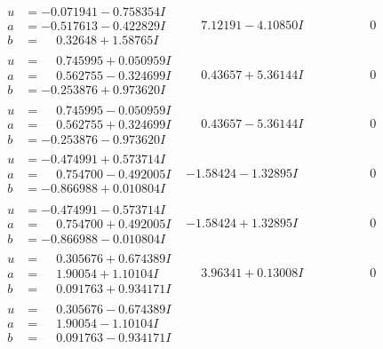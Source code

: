 \documentclass[1p]{elsarticle_modified}
\theoremstyle{definition}
\begin{document}
$$\begin{array}{c|c|c}
\begin{aligned}
u &= -0.071941 - 0.758354 I \\
a &= -0.517613 - 0.422829 I \\
b &= \phantom{-}0.32648 + 1.58765 I\end{aligned}
 & \phantom{-}7.12191 - 4.10850 I & \phantom{-0.000000 } 0 \\ \hline\begin{aligned}
u &= \phantom{-}0.745995 + 0.050959 I \\
a &= \phantom{-}0.562755 - 0.324699 I \\
b &= -0.253876 + 0.973620 I\end{aligned}
 & \phantom{-}0.43657 + 5.36144 I & \phantom{-0.000000 } 0 \\ \hline\begin{aligned}
u &= \phantom{-}0.745995 - 0.050959 I \\
a &= \phantom{-}0.562755 + 0.324699 I \\
b &= -0.253876 - 0.973620 I\end{aligned}
 & \phantom{-}0.43657 - 5.36144 I & \phantom{-0.000000 } 0 \\ \hline\begin{aligned}
u &= -0.474991 + 0.573714 I \\
a &= \phantom{-}0.754700 - 0.492005 I \\
b &= -0.866988 + 0.010804 I\end{aligned}
 & -1.58424 - 1.32895 I & \phantom{-0.000000 } 0 \\ \hline\begin{aligned}
u &= -0.474991 - 0.573714 I \\
a &= \phantom{-}0.754700 + 0.492005 I \\
b &= -0.866988 - 0.010804 I\end{aligned}
 & -1.58424 + 1.32895 I & \phantom{-0.000000 } 0 \\ \hline\begin{aligned}
u &= \phantom{-}0.305676 + 0.674389 I \\
a &= \phantom{-}1.90054 + 1.10104 I \\
b &= \phantom{-}0.091763 + 0.934171 I\end{aligned}
 & \phantom{-}3.96341 + 0.13008 I & \phantom{-0.000000 } 0 \\ \hline\begin{aligned}
u &= \phantom{-}0.305676 - 0.674389 I \\
a &= \phantom{-}1.90054 - 1.10104 I \\
b &= \phantom{-}0.091763 - 0.934171 I\end{aligned}

\end{array}$$
\end{document}

